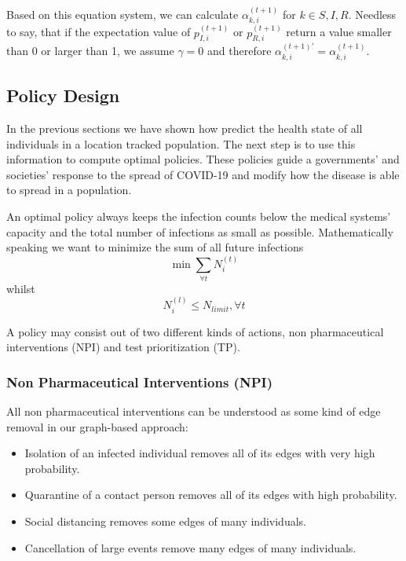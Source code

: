 Based on this equation system, we can calculate $\alpha_{k,i}^{(t+1)}$ for $k\in{S,I,R}$. Needless to say, that if the expectation value of $p_{I,i}^{(t+1)}$ or $p_{R,i}^{(t+1)}$ return a value smaller than 0 or larger than 1, we assume $\gamma=0$ and therefore $\alpha_{k,i}^{(t+1)\prime}=\alpha_{k,i}^{(t+1)}$.



\subsection{Policy Design}
In the previous sections we have shown how predict the health state of all individuals in a location tracked population.
The next step is to use this information to compute optimal policies.
These policies guide a governments' and societies' response to the spread of COVID-19 and modify how the disease is able to spread in a population.

An optimal policy always keeps the infection counts below the medical systems' capacity and the total number of infections as small as possible.
Mathematically speaking we want to minimize the sum of all future infections
\begin{equation}\label{eq:number-of-infected}
	\min \sum_{\forall t} N^{(t)}_i
\end{equation}
whilst
\begin{equation}\label{eq:cap-constraint}
	N^{(l)}_i \leq N_{limit}, \forall t
\end{equation}

A policy may consist out of two different kinds of actions, non pharmaceutical interventions (NPI) and test prioritization (TP).


\subsubsection{Non Pharmaceutical Interventions (NPI)}
All non pharmaceutical interventions can be understood as some kind of edge removal in our graph-based approach:
\begin{itemize}
	\item Isolation of an infected individual removes all of its edges with very high probability.
	\item Quarantine of a contact person removes all of its edges with high probability.
	\item Social distancing removes some edges of many individuals.
	\item Cancellation of large events remove many edges of many individuals.
\end{itemize}

